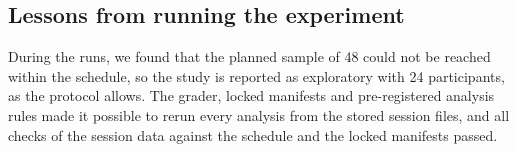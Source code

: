 \subsection{Lessons from running the experiment}
During the runs, we found that the planned sample of 48 could not be reached within the schedule, so the study is reported as exploratory with 24 participants, as the protocol allows.
The grader, locked manifests and pre-registered analysis rules made it possible to rerun every analysis from the stored session files, and all checks of the session data against the schedule and the locked manifests passed.
